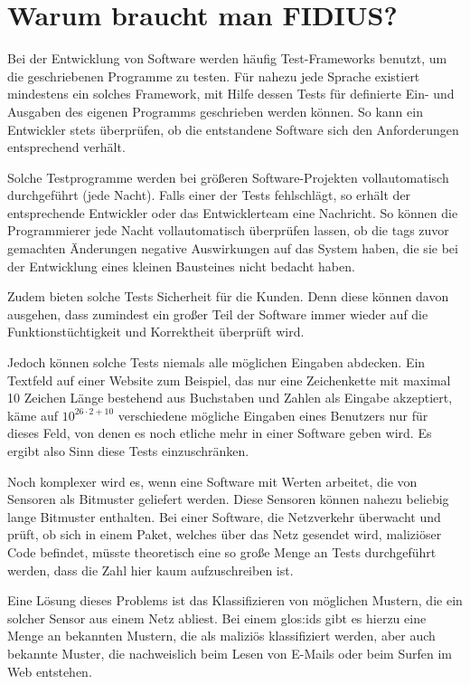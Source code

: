 
\section{Warum braucht man FIDIUS?}
\label{sec:motivation:need}

\authors{\DE \and \JF}{\LM \and \MW \and \DH}

Bei der Entwicklung von Software werden häufig Test-Frameworks
benutzt, um die geschriebenen Programme zu testen. Für nahezu jede
Sprache existiert mindestens ein solches Framework, mit Hilfe dessen
Tests für definierte Ein- und Ausgaben des eigenen Programms
geschrieben werden können. So kann ein Entwickler stets überprüfen, ob
die entstandene Software sich den Anforderungen entsprechend verhält.

Solche Testprogramme werden bei größeren Software-Projekten
vollautomatisch durchgeführt (\zB jede Nacht). Falls einer der Tests
fehlschlägt, so erhält der entsprechende Entwickler oder das
Entwicklerteam eine Nachricht. So können die Programmierer jede Nacht
vollautomatisch überprüfen lassen, ob die tags zuvor gemachten Änderungen
negative Auswirkungen auf das System haben, die sie bei der
Entwicklung eines kleinen Bausteines nicht bedacht haben.

Zudem bieten solche Tests Sicherheit für die Kunden. Denn diese können
davon ausgehen, dass zumindest ein großer Teil der Software immer
wieder auf die Funktionstüchtigkeit und Korrektheit überprüft wird.

Jedoch können solche Tests niemals alle möglichen Eingaben
abdecken. Ein Textfeld auf einer Website zum Beispiel, das nur eine
Zeichenkette mit maximal 10 Zeichen Länge bestehend aus Buchstaben und
Zahlen als Eingabe akzeptiert, käme auf $10^{26\cdot 2 + 10}$
verschiedene mögliche Eingaben eines Benutzers nur für dieses Feld,
von denen es noch etliche mehr in einer Software geben wird. Es ergibt
also Sinn diese Tests einzuschränken.

Noch komplexer wird es, wenn eine Software mit Werten arbeitet, die
von Sensoren als Bitmuster geliefert werden. Diese Sensoren können
nahezu beliebig lange Bitmuster enthalten. Bei einer Software, die
Netzverkehr überwacht und prüft, ob sich in einem Paket, welches über
das Netz gesendet wird, maliziöser Code befindet, müsste theoretisch
eine so große Menge an Tests durchgeführt werden, dass die Zahl hier
kaum aufzuschreiben ist.

Eine Lösung dieses Problems ist das Klassifizieren von möglichen
Mustern, die ein solcher Sensor aus einem Netz abliest. Bei einem
\gls{glos:ids} gibt es hierzu eine Menge an bekannten Mustern, die als
maliziös klassifiziert werden, aber auch bekannte Muster, die
nachweislich beim Lesen von E-Mails oder beim Surfen im Web entstehen.

